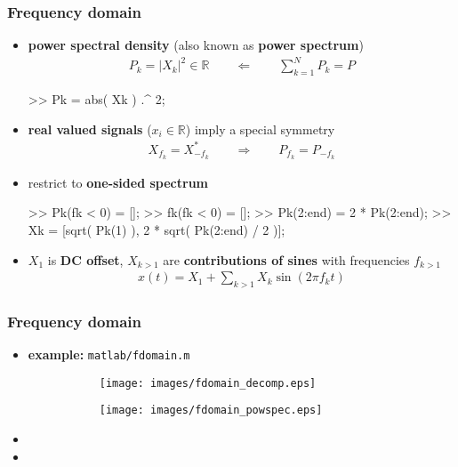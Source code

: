 \begin{frame}[fragile]
	\frametitle{Frequency domain}
	\begin{itemize}
		\item \textbf{power spectral density} (also known as \textbf{power spectrum})
			\begin{align*}
				P_k=\lvert X_k\rvert^2\in\mathbb R\qquad\Leftarrow\qquad\sum_{k=1}^NP_k=P
			\end{align*}
			\begin{code}
>> Pk = abs( Xk ) .^ 2; \color{medium}%
			\end{code}
		\item \textbf{real valued signals} ($x_i\in\mathbb R$) imply a special symmetry
			\begin{align*}
				X_{f_k}=X_{-f_k}^*\qquad\Rightarrow\qquad P_{f_k}=P_{-f_k}
			\end{align*}
		\item restrict to \textbf{one-sided spectrum}
			\begin{code}
>> Pk(fk < 0) = []; \color{medium}%
>> fk(fk < 0) = [];
>> Pk(2:end) = 2 * Pk(2:end); \color{medium}%
>> Xk = [sqrt( Pk(1) ), 2 * sqrt( Pk(2:end) / 2 )];
			\end{code}
		\item $X_1$ is \textbf{DC offset}, $X_{k>1}$ are \textbf{contributions of sines} with frequencies $f_{k>1}$
			\begin{align*}
				x(t)=X_1+\sum_{k>1}X_k\sin(2\pi f_kt)
			\end{align*}
	\end{itemize}
\end{frame}

\begin{frame}
	\frametitle{Frequency domain}
	\begin{itemize}
		\item \textbf{example:} \texttt{matlab/fdomain.m}
			\begin{figure}
				\centering
				\begin{subfigure}[c]{0.48\linewidth}
					\texttt{[image: images/fdomain\_decomp.eps]}
				\end{subfigure}
				\hspace{0.01\linewidth}
				\begin{subfigure}[c]{0.48\linewidth}
					\texttt{[image: images/fdomain\_powspec.eps]}
				\end{subfigure}
			\end{figure}
		\item {}
		\item {}
	\end{itemize}
\end{frame}

